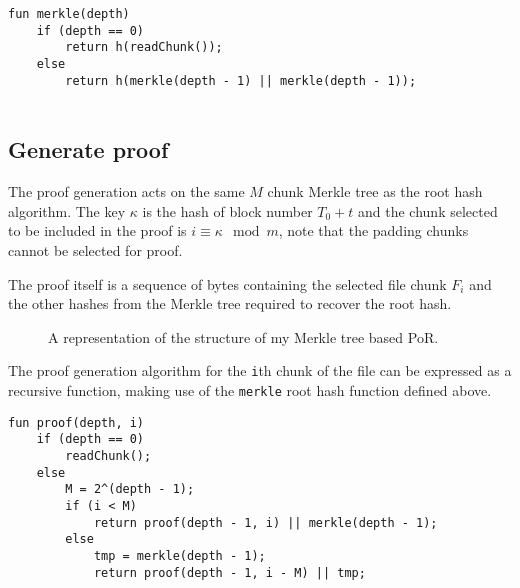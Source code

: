 \documentclass[12pt,a4paper,twoside,openright]{report}
\begin{document}
\lstset{
breaklines=true,
basicstyle=\ttfamily\small,
tabsize=4
}
\begin{lstlisting}
fun merkle(depth) 
    if (depth == 0) 
        return h(readChunk());
    else 
        return h(merkle(depth - 1) || merkle(depth - 1));
    

\end{lstlisting}

\subsection{Generate proof}\label{pseudo-proof}

The proof generation acts on the same $M$ chunk Merkle tree as the root hash algorithm.
The key $\kappa$ is the hash of block number $T_0 + t$ and the chunk selected to be included in the proof is $i \equiv \kappa \mod m$, note that
the padding chunks cannot be selected for proof.

The proof itself is a sequence of bytes containing the selected file chunk $F_i$ and the other hashes from the Merkle tree required to recover the root hash.

\vspace{1em}

\begin{figure}[H]
\caption[Proof structure]{A representation of the structure of my Merkle tree based PoR.}
\label{fig-proof}
\end{figure}

The proof generation algorithm for the \texttt{i}th chunk of the file can be expressed as a recursive function,
making use of the \texttt{merkle} root hash function defined above.

\begin{lstlisting}
fun proof(depth, i)
    if (depth == 0)
        readChunk();
    else
        M = 2^(depth - 1);
        if (i < M)
            return proof(depth - 1, i) || merkle(depth - 1);
        else
            tmp = merkle(depth - 1);
            return proof(depth - 1, i - M) || tmp;
\end{lstlisting}
\end{document}
